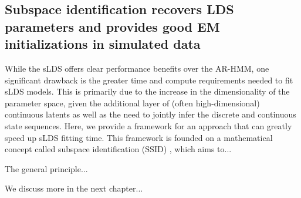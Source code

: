 \subsection{Subspace identification recovers LDS parameters and provides good EM initializations in simulated data}
\label{sec:slds:3.2.5}

While the sLDS offers clear performance benefits over the AR-HMM, one significant drawback is the greater time and compute requirements needed to fit sLDS models. This is primarily due to the increase in the dimensionality of the parameter space, given the additional layer of (often high-dimensional) continuous latents as well as the need to jointly infer the discrete and continuous state sequences. Here, we provide a framework for an approach that can greatly speed up sLDS fitting time. This framework is founded on a mathematical concept called subspace identification (SSID) \cite{ho_editorial_1966, van_overschee_n4sid_1994, viberg_subspace-based_1995, van_overschee_subspace_1996}, which aims to... 

The general principle... 

We discuss more in the next chapter...